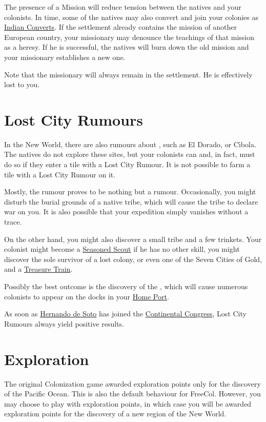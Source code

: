 \documentclass[12pt]{book}
\begin{document}
The presence of a Mission will reduce tension between the natives and
your colonists. In time, some of the natives may also convert and join
your colonies as \hyperlink{Indian Convert}{Indian Converts}. If the
settlement already contains the mission of another European country,
your missionary may denounce the teachings of that mission as a
heresy. If he is successful, the natives will burn down the old
mission and your missionary establishes a new one.

Note that the missionary will always remain in the settlement. He is
effectively lost to you.


\hypertarget{Lost City Rumours}{\section{Lost City Rumours}}

In the New World, there are also rumours about ,
such as El Dorado, or C{\'\i}bola. The natives do not explore these
sites, but your colonists can and, in fact, must do so if they enter a
tile with a Lost City Rumour. It is not possible to farm a tile with a
Lost City Rumour on it.

Mostly, the rumour proves to be nothing but a rumour. Occasionally,
you might disturb the burial grounds of a native tribe, which will
cause the tribe to declare war on you. It is also possible that your
expedition simply vanishes without a trace.

On the other hand, you might also discover a small tribe and a few
trinkets. Your colonist might become a \hyperlink{Seasoned
  Scout}{Seasoned Scout} if he has no other skill, you might discover
the sole survivor of a lost colony, or even one of the Seven Cities of
Gold, and a \hyperlink{Treasure Train}{Treasure Train}.

Possibly the best outcome is the discovery of the , which will cause numerous colonists to appear on the docks in
your \hyperlink{Home Port}{Home Port}.

As soon as \hyperlink{Hernando de Soto}{Hernando de Soto} has joined
the \hyperlink{Continental Congress}{Continental Congress}, Lost City
Rumours always yield positive results.


\hypertarget{Exploration}{\section{Exploration}}

The original Colonization game awarded exploration points only for the
discovery of the Pacific Ocean. This is also the default behaviour for
FreeCol. However, you may choose to play with exploration points, in
which case you will be awarded exploration points for the discovery of
a new region of the New World.
\end{document}
